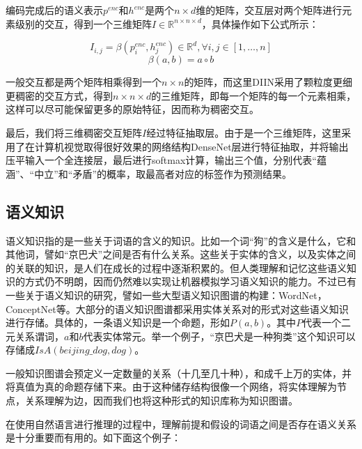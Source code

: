 \documentclass[UTF8,11pt,a4paper,nofonts]{ctexart}
\numberwithin{equation}{section}
\begin{document}
编码完成后的语义表示$p^{enc}$和$h^{enc}$是两个$n\times d$维的矩阵，交互层对两个矩阵进行元素级别的交互，得到一个三维矩阵$I \in \mathbb{R}^{n\times n \times d}$，具体操作如下公式所示：

\begin{equation}
I_{i,j} = \beta(p^{enc}_i, h^{enc}_j) \in \mathbb{R}^d, \forall i, j \in [1,\dots,n]
\end{equation}
\begin{equation}
\beta(a, b) = a \circ b
\end{equation}

一般交互都是两个矩阵相乘得到一个$n\times n$的矩阵，而这里DIIN采用了颗粒度更细更稠密的交互方式，得到$n\times n \times d$的三维矩阵，即每一个矩阵的每一个元素相乘，这样可以尽可能保留更多的原始特征，因而称为稠密交互。

最后，我们将三维稠密交互矩阵$I$经过特征抽取层。由于是一个三维矩阵，这里采用了在计算机视觉取得很好效果的网络结构DenseNet层进行特征抽取，并将输出压平输入一个全连接层，最后进行softmax计算，输出三个值，分别代表“蕴涵”、“中立”和“矛盾”的概率，取最高者对应的标签作为预测结果。




\subsection{语义知识}

语义知识指的是一些关于词语的含义的知识。比如一个词“狗”的含义是什么，它和其他词，譬如“京巴犬”之间是否有什么关系。这些关于实体的含义，以及实体之间的关联的知识，是人们在成长的过程中逐渐积累的。但人类理解和记忆这些语义知识的方式仍不明朗，因而仍然难以实现让机器模拟学习语义知识的能力。不过已有一些关于语义知识的研究，譬如一些大型语义知识图谱的构建：WordNet，ConceptNet等。大部分的语义知识图谱都采用实体关系对的形式对这些语义知识进行存储。具体的，一条语义知识是一个命题，形如$P(a, b)$。其中$P$代表一个二元关系谓词，$a$和$b$代表实体常元。举一个例子，“京巴犬是一种狗类”这个知识可以存储成$IsA(beijing\_dog, dog)$。

一般知识图谱会预定义一定数量的关系（十几至几十种），和成千上万的实体，并将真值为真的命题存储下来。由于这种储存结构很像一个网络，将实体理解为节点，关系理解为边，因而我们也将这种形式的知识库称为知识图谱。


在使用自然语言进行推理的过程中，理解前提和假设的词语之间是否存在语义关系是十分重要而有用的。如下面这个例子：
    
\end{document}

